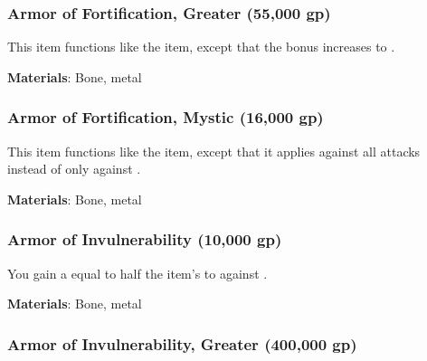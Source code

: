 \lowercase{\hypertarget{item:Armor of Fortification, Greater}{}}\label{item:Armor of Fortification, Greater}
\hypertarget{item:Armor of Fortification, Greater}{\subsubsection{Armor of Fortification, Greater\hfill{} (55,000 gp)}}

This item functions like the  item, except that the bonus increases to .



\vspace{0.25em}
\textbf{Materials}: Bone, metal


\lowercase{\hypertarget{item:Armor of Fortification, Mystic}{}}\label{item:Armor of Fortification, Mystic}
\hypertarget{item:Armor of Fortification, Mystic}{\subsubsection{Armor of Fortification, Mystic\hfill{} (16,000 gp)}}

This item functions like the  item, except that it applies against all attacks instead of only against .



\vspace{0.25em}
\textbf{Materials}: Bone, metal


\lowercase{\hypertarget{item:Armor of Invulnerability}{}}\label{item:Armor of Invulnerability}
\hypertarget{item:Armor of Invulnerability}{\subsubsection{Armor of Invulnerability\hfill{} (10,000 gp)}}

You gain a  equal to half the item's  to  against .



\vspace{0.25em}
\textbf{Materials}: Bone, metal


\lowercase{\hypertarget{item:Armor of Invulnerability, Greater}{}}\label{item:Armor of Invulnerability, Greater}
\hypertarget{item:Armor of Invulnerability, Greater}{\subsubsection{Armor of Invulnerability, Greater\hfill{} (400,000 gp)}}

